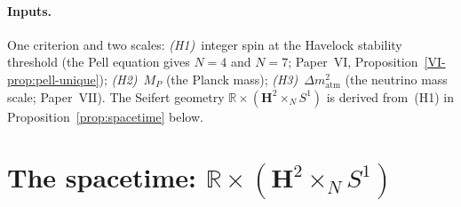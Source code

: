 \paragraph{Inputs.}
One criterion and two scales:
\emph{(H1)}~integer spin at the Havelock stability threshold
(the Pell equation gives $N = 4$ and $N = 7$;
Paper~VI, Proposition~\ref*{VI-prop:pell-unique});
\emph{(H2)}~$M_P$ (the Planck mass);
\emph{(H3)}~$\Delta m^2_{\mathrm{atm}}$ (the neutrino mass scale;
Paper~VII).
The Seifert geometry
$\mathbb{R} \times (\mathbf{H}^2 \times_N S^1)$
is derived from~(H1) in Proposition~\ref{prop:spacetime} below.

\section{The spacetime: $\mathbb{R} \times (\mathbf{H}^2 \times_N S^1)$}
\label{sec:spacetime}

